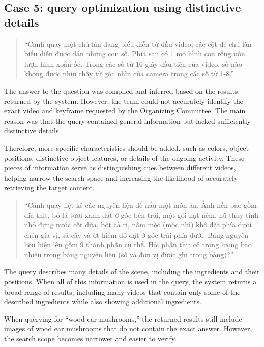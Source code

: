 \documentclass[11pt,a4paper]{article}
\begin{document}
\subsection{Case 5: query optimization using distinctive details}

\begin{quote}
    ``Cảnh quay một chú lân đang biểu diễn từ đầu video, các cột để chú lân biểu diễn được dán những con số. Phía sau có 1 mô hình con rồng uốn lượn hình xoắn ốc. Trong các số từ 16 giây đầu tiên của video, số nào không được nhìn thấy từ góc nhìn của camera trong các số từ 1-8.''
\end{quote}

The answer to the question was compiled and inferred based on the results returned by the system. However, the team could not accurately identify the exact video and keyframe requested by the Organizing Committee. The main reason was that the query contained general information but lacked sufficiently distinctive details.

Therefore, more specific characteristics should be added, such as colors, object positions, distinctive object features, or details of the ongoing activity. These pieces of information serve as distinguishing cues between different videos, helping narrow the search space and increasing the likelihood of accurately retrieving the target content.

\begin{quote}
    ``Cảnh quay liệt kê các nguyên liệu để nấu một món ăn. Ảnh nền bao gồm dĩa thịt, bó lá tươi xanh đặt ở góc bên trái, một gói hạt nêm, hũ thủy tinh nhỏ đựng nước cốt dừa, bột cà ri, nấm mèo (mộc nhĩ) khô đặt phía dưới chén gia vị, sả cây và ớt hiểm đỏ đặt ở góc trái phía dưới. Bảng nguyên liệu hiện lên gồm 9 thành phần cụ thể. Hỏi phần thịt có trọng lượng bao nhiêu trong bảng nguyên liệu (số và đơn vị được ghi trong bảng)?''
\end{quote}

The query describes many details of the scene, including the ingredients and their positions. When all of this information is used in the query, the system returns a broad range of results, including many videos that contain only some of the described ingredients while also showing additional ingredients.

When querying for “wood ear mushrooms,” the returned results still include images of wood ear mushrooms that do not contain the exact answer. However, the search scope becomes narrower and easier to verify.
\end{document}
